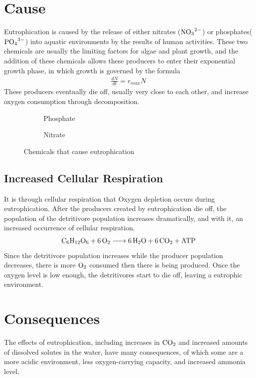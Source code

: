 \documentclass{article}
\begin{document}
\section{Cause}
Eutrophication is caused by the release of either nitrates ($\ce{NO3^2-}$) or phosphates($\ce{PO4^3-}$) into aquatic environments by the results of human activities.
These two chemicals are usually the limiting factors for algae and plant growth, and the addition of these chemicals allows these producers to enter their exponential growth phase, in which growth is governed by the formula
\begin{align}
    \frac{dN}{dt} = r_{max}N
\end{align}
These producers eventually die off, usually very close to each other, and increase oxygen consumption through decomposition.
\begin{figure}[h]
    \begin{subfigure}{.5\textwidth}
        \centering
        \caption{Phosphate}
    \end{subfigure}%
    \begin{subfigure}{.5\textwidth}
        \centering
        \caption{Nitrate}
    \end{subfigure}
    \caption{Chemicals that cause eutrophication}
\end{figure}
    \subsection{Increased Cellular Respiration}
    It is through cellular respiration that Oxygen depletion occurs during eutrophication.
    After the producers created by eutrophication die off, the population of the detritivore population increases dramatically, and with it, an increased occurrence of cellular respiration.
    \begin{align}
        \ce{C6H12O6 + 6O2 -> 6H2O + 6CO2 + ATP}
    \end{align}
    Since the detritivore population increases while the producer population decreases, there is more $\ce{O2}$ consumed then there is being produced.
    Once the oxygen level is low enough, the detritivores start to die off, leaving a eutrophic environment.
\section{Consequences}
The effects of eutrophication, including increases in $\ce{CO2}$ and increased amounts of dissolved solutes in the water, have many consequences, of which some are a more acidic environment, less oxygen-carrying capacity, and increased ammonia level.
\end{document}
